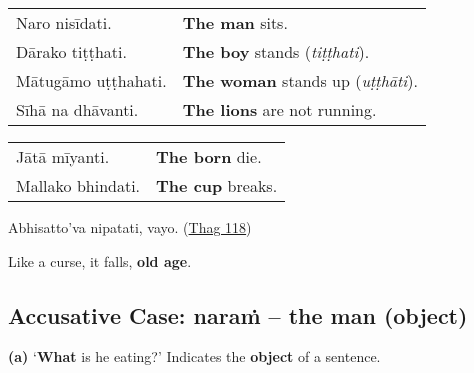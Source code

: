 \documentclass[11pt,oneside]{memoir}
\begin{document}
\bigskip

\begin{widecols}


\begin{center}
\begin{tabular}{ll}
Naro nisīdati. & \textbf{The man} sits.\\[0pt]
Dārako tiṭṭhati. & \textbf{The boy} stands (\emph{tiṭṭhati}).\\[0pt]
Mātugāmo uṭṭhahati. & \textbf{The woman} stands up (\emph{uṭṭhāti}).\\[0pt]
Sīhā na dhāvanti. & \textbf{The lions} are not running.\\[0pt]
\end{tabular}
\end{center}

\columnbreak

\begin{center}
\begin{tabular}{ll}
Jātā mīyanti. & \textbf{The born} die.\\[0pt]
Mallako bhindati. & \textbf{The cup} breaks.\\[0pt]
\end{tabular}
\end{center}

{\centering

Abhisatto'va nipatati, vayo. (\href{https://suttacentral.net/thag1.118/pli/ms}{Thag 118})

Like a curse, it falls, \textbf{old age}.

\par}
\end{widecols}

\clearpage

\subsection{Accusative Case: naraṁ -- the man (object)}
\label{sec:org0848429}

\textbf{(a)} `\textbf{What} is he eating?' Indicates the \textbf{object} of a sentence.

\renewcommand{\arraystretch}{1.8}
\end{document}
